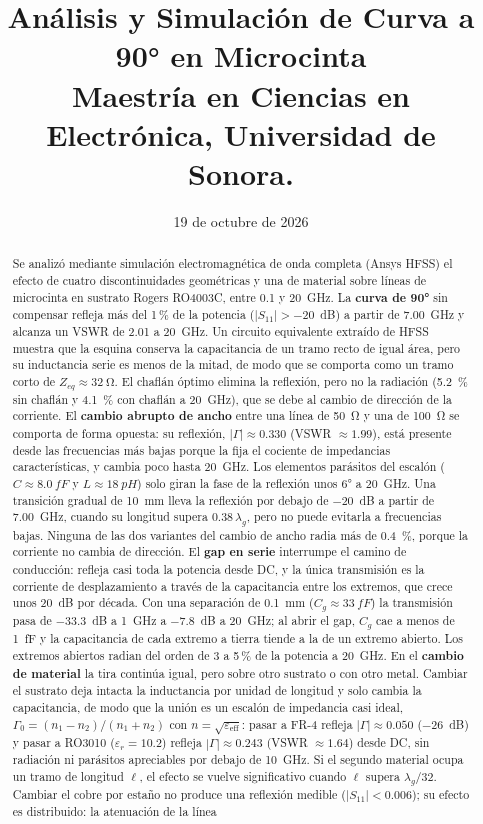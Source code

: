\documentclass[11pt,letterpaper]{article}
\title{\textbf{Análisis y Simulación de Curva a 90° en Microcinta}\\[6pt]
\small Maestría en Ciencias en Electrónica, Universidad de Sonora.}
\date{19 de octubre de 2026}
\begin{document}
\maketitle

\begin{abstract}
Se analizó mediante simulación electromagnética de onda completa (Ansys HFSS) el efecto de cuatro discontinuidades geométricas y una de material sobre líneas de microcinta en sustrato Rogers RO4003C, entre \SI{0.1}{} y \SI{20}{GHz}. La \textbf{curva de \ang{90}} sin compensar refleja más del 1\,\% de la potencia ($|S_{11}|>-20$~dB) a partir de \SI{7.00}{GHz} y alcanza un VSWR de 2.01 a \SI{20}{GHz}. Un circuito equivalente extraído de HFSS muestra que la esquina conserva la capacitancia de un tramo recto de igual área, pero su inductancia serie es menos de la mitad, de modo que se comporta como un tramo corto de $Z_{eq}\approx\SI{32}{\ohm}$. El chaflán óptimo elimina la reflexión, pero no la radiación (\SI{5.2}{\percent} sin chaflán y \SI{4.1}{\percent} con chaflán a \SI{20}{GHz}), que se debe al cambio de dirección de la corriente. El \textbf{cambio abrupto de ancho} entre una línea de \SI{50}{\ohm} y una de \SI{100}{\ohm} se comporta de forma opuesta: su reflexión, $|\Gamma|\approx0.330$ (VSWR $\approx1.99$), está presente desde las frecuencias más bajas porque la fija el cociente de impedancias características, y cambia poco hasta \SI{20}{GHz}. Los elementos parásitos del escalón ($C\approx\SI{8.0}{fF}$ y $L\approx\SI{18}{pH}$) solo giran la fase de la reflexión unos \ang{6} a \SI{20}{GHz}. Una transición gradual de \SI{10}{mm} lleva la reflexión por debajo de $-20$~dB a partir de \SI{7.00}{GHz}, cuando su longitud supera $0.38\,\lambda_g$, pero no puede evitarla a frecuencias bajas. Ninguna de las dos variantes del cambio de ancho radia más de \SI{0.4}{\percent}, porque la corriente no cambia de dirección. El \textbf{gap en serie} interrumpe el camino de conducción: refleja casi toda la potencia desde DC, y la única transmisión es la corriente de desplazamiento a través de la capacitancia entre los extremos, que crece unos 20~dB por década. Con una separación de \SI{0.1}{mm} ($C_g\approx\SI{33}{fF}$) la transmisión pasa de \SI{-33.3}{dB} a \SI{1}{GHz} a \SI{-7.8}{dB} a \SI{20}{GHz}; al abrir el gap, $C_g$ cae a menos de \SI{1}{fF} y la capacitancia de cada extremo a tierra tiende a la de un extremo abierto. Los extremos abiertos radian del orden de 3 a 5\,\% de la potencia a \SI{20}{GHz}. En el \textbf{cambio de material} la tira continúa igual, pero sobre otro sustrato o con otro metal. Cambiar el sustrato deja intacta la inductancia por unidad de longitud y solo cambia la capacitancia, de modo que la unión es un escalón de impedancia casi ideal, $\Gamma_0=(n_1-n_2)/(n_1+n_2)$ con $n=\sqrt{\varepsilon_{\mathrm{eff}}}$: pasar a FR-4 refleja $|\Gamma|\approx0.050$ ($-26$~dB) y pasar a RO3010 ($\varepsilon_r=10.2$) refleja $|\Gamma|\approx0.243$ (VSWR $\approx1.64$) desde DC, sin radiación ni parásitos apreciables por debajo de \SI{10}{GHz}. Si el segundo material ocupa un tramo de longitud $\ell$, el efecto se vuelve significativo cuando $\ell$ supera $\lambda_g/32$. Cambiar el cobre por estaño no produce una reflexión medible ($|S_{11}|<0.006$); su efecto es distribuido: la atenuación de la línea 
\end{abstract}
\end{document}
